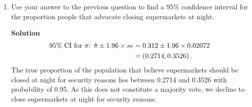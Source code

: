 \begin{enumerate}
\begin{enumerate}
        \item Use your answer to the previous question to find a 95\% confidence interval for the proportion people that advocate closing supermarkets at night.
        \begin{framed}{\textbf{Solution}}
        \begin{align}
            \text{95\% CI for $\pi$: } \Hat{\pi} \pm 1.96 \times se &= 0.312 \pm 1.96 \times 0.02072 \\
            &= \left( 0.2714 , 0.3526\right).
        \end{align}
        The true proportion of the population that believe supermarkets should be closed at night for security reasons lies between 0.2714 and 0.3526 with probability of 0.95. As this does not constitute a majority vote, we decline to close supermarkets at night for security reasons. 
        \end{framed}
    \end{enumerate}
    

\end{enumerate}
